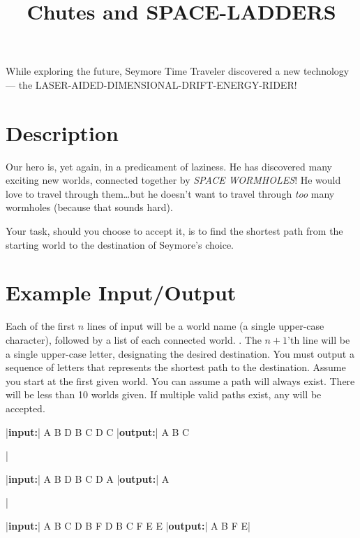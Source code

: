 \documentclass{../codeproblem}
\begin{document}
\title{Chutes and SPACE-LADDERS}

\begin{flavor}
  While exploring the future, Seymore Time Traveler discovered a new
  technology --- the LASER-AIDED-DIMENSIONAL-DRIFT-ENERGY-RIDER!
\end{flavor}

\section*{Description}
Our hero is, yet again, in a predicament of laziness. He has discovered
many exciting new worlds, connected together by \emph{SPACE WORMHOLES}! He
would love to travel through them\ldots but he doesn't want to travel
through \emph{too} many wormholes (because that sounds hard).

Your task, should you choose to accept it, is to find the shortest
path from the starting world to the destination of Seymore's choice.

\section*{Example Input/Output}

Each of the first $n$ lines of input will be a world name (a single
upper-case character), followed by a list of each connected world. 
. The $n+1$'th line will be a single upper-case
letter, designating the desired destination. You must output a
sequence of letters that represents the shortest path to the
destination. Assume you start at the first given world. You can assume
a path will always exist. There will be less than 10 worlds given.
If multiple valid paths exist, any will be accepted.


\begin{minipage}{.33\linewidth}
  \begin{example}
|\textbf{input:}|
A B D
B C D
C
|\textbf{output:}|
A B C


|\end{example}
\end{minipage}
\begin{minipage}{.33\linewidth}
\begin{example}
|\textbf{input:}|
A B D
B C D
A
|\textbf{output:}|
A


|\end{example}
\end{minipage}
\begin{minipage}{.33\linewidth}
\begin{example}
|\textbf{input:}|
A B C D
B F
D B C
F E
E
|\textbf{output:}|
A B F E|\end{example}
\end{minipage}
\end{document}
